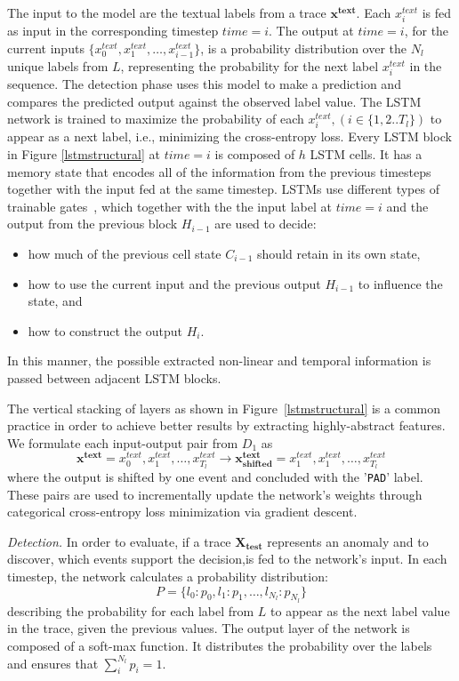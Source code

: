 The input to the model are the textual labels from a trace $\mathbf{x^{text}}$.
Each $x_i^{text}$ is fed as input in the corresponding timestep $time=i$. 
The output at $time=i$, for the current inputs $\{x_0^{text}, x_1^{text}, \dots, x_{i-1}^{text}\}$, is a probability distribution over the $N_l$ unique labels from $L$, representing the probability for the next label $x_i^{text}$ in the sequence. 
The detection phase uses this model to make a prediction and compares the predicted output against the observed label value. 
The LSTM network is trained to maximize the probability of each $x_{i}^{text},  (i\in \{1,2.. T_{l}\})$ to appear as a next label, i.e., minimizing the cross-entropy loss. 
Every LSTM block in Figure \ref{lstmstructural} at $time=i$ is composed of $h$ LSTM cells. 
It has a memory state that encodes all of the information from the previous timesteps together with the input fed at the same timestep.
LSTMs use different types of trainable gates~\cite{hochreiter1997long}, which together with the the input label at $time=i$ and the output from the previous block $H_{i-1}$ are used to decide:
\begin{itemize}
\item how much of the previous cell state $C_{i-1}$ should retain in its own state,
\item how to use the current input and the previous output $H_{i-1}$ to influence the state, and 
\item how to construct the output $H_{i}$.
\end{itemize}
In this manner, the possible extracted non-linear and temporal information is passed between adjacent LSTM blocks. 

The vertical stacking of layers as shown in Figure~\ref{lstmstructural} is a common practice in order to achieve better results by extracting highly-abstract features. We formulate each input-output pair from $D_1$ as $$\mathbf{x^{text}}=x_0^{text}, x_1^{text}, \dots, x_{T_l}^{text} \rightarrow \mathbf{x_{shifted}^{text}}=x_1^{text}, x_1^{text}, \dots, x_{T_l}^{text}$$ where the output is shifted by one event and concluded with the '\texttt{PAD}' label. These pairs are used to incrementally update the network's weights through categorical cross-entropy loss minimization via gradient descent.


\emph{Detection.} In order to evaluate, if a trace $\mathbf{X_{test}}$ represents an  anomaly and to discover, which events support the decision,is fed to the network's input. In each timestep, the network calculates a probability distribution:
$$P=\{l_0:p_0, l_1:p_1, \dots, l_{N_l}:p_{N_l}\}$$ 
describing the probability for each label from $L$ to appear as the next label value in the trace, given the previous values. The output layer of the network is composed of a soft-max function. It distributes the probability over the labels and ensures that $\sum_i^{N_l}{p_i} = 1$. 

